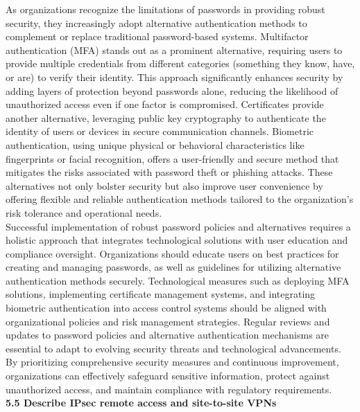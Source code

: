\documentclass{article}
\begin{document}
	As organizations recognize the limitations of passwords in providing robust security, they increasingly adopt alternative authentication methods to complement or replace traditional password-based systems. Multifactor authentication (MFA) stands out as a prominent alternative, requiring users to provide multiple credentials from different categories (something they know, have, or are) to verify their identity. This approach significantly enhances security by adding layers of protection beyond passwords alone, reducing the likelihood of unauthorized access even if one factor is compromised. Certificates provide another alternative, leveraging public key cryptography to authenticate the identity of users or devices in secure communication channels. Biometric authentication, using unique physical or behavioral characteristics like fingerprints or facial recognition, offers a user-friendly and secure method that mitigates the risks associated with password theft or phishing attacks. These alternatives not only bolster security but also improve user convenience by offering flexible and reliable authentication methods tailored to the organization's risk tolerance and operational needs.\\
	
	Successful implementation of robust password policies and alternatives requires a holistic approach that integrates technological solutions with user education and compliance oversight. Organizations should educate users on best practices for creating and managing passwords, as well as guidelines for utilizing alternative authentication methods securely. Technological measures such as deploying MFA solutions, implementing certificate management systems, and integrating biometric authentication into access control systems should be aligned with organizational policies and risk management strategies. Regular reviews and updates to password policies and alternative authentication mechanisms are essential to adapt to evolving security threats and technological advancements. By prioritizing comprehensive security measures and continuous improvement, organizations can effectively safeguard sensitive information, protect against unauthorized access, and maintain compliance with regulatory requirements.\\
  
\textbf{5.5 Describe IPsec remote access and site-to-site VPNs}\\
\end{document}
